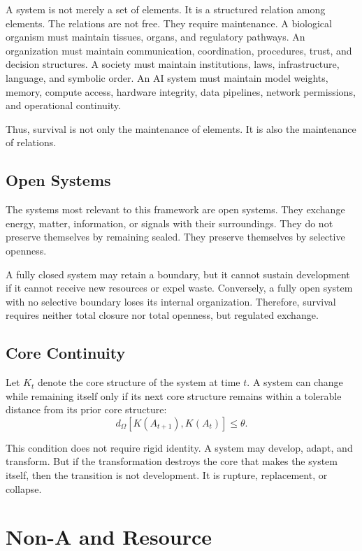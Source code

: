 \documentclass[11pt,a4paper]{article}
\begin{document}
A system is not merely a set of elements. It is a structured relation among elements. The relations are not free. They require maintenance. A biological organism must maintain tissues, organs, and regulatory pathways. An organization must maintain communication, coordination, procedures, trust, and decision structures. A society must maintain institutions, laws, infrastructure, language, and symbolic order. An AI system must maintain model weights, memory, compute access, hardware integrity, data pipelines, network permissions, and operational continuity.

Thus, survival is not only the maintenance of elements. It is also the maintenance of relations.

\subsection{Open Systems}

The systems most relevant to this framework are open systems. They exchange energy, matter, information, or signals with their surroundings. They do not preserve themselves by remaining sealed. They preserve themselves by selective openness.

A fully closed system may retain a boundary, but it cannot sustain development if it cannot receive new resources or expel waste. Conversely, a fully open system with no selective boundary loses its internal organization. Therefore, survival requires neither total closure nor total openness, but regulated exchange.

\subsection{Core Continuity}

Let $K_t$ denote the core structure of the system at time $t$. A system can change while remaining itself only if its next core structure remains within a tolerable distance from its prior core structure:
\[
d_{\Omega}[K(A_{t+1}),K(A_t)]\leq\theta.
\]

This condition does not require rigid identity. A system may develop, adapt, and transform. But if the transformation destroys the core that makes the system itself, then the transition is not development. It is rupture, replacement, or collapse.

\section{Non-A and Resource}
\end{document}
